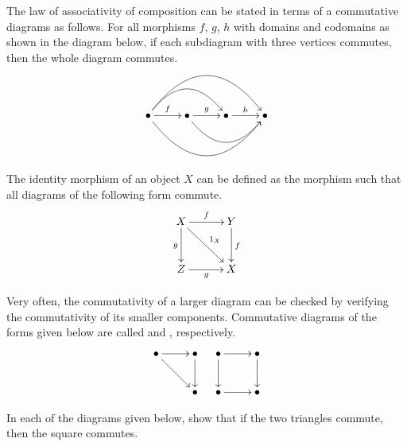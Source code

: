 \begin{Example}
The law of associativity of composition can be stated in terms of a commutative diagrams as follows. For all morphisms $f$, $g$, $h$ with domains and codomains as shown in the diagram below, if each subdiagram with three vertices commutes, then the whole diagram commutes.
\begin{equation*}
\xymatrix{
\bullet \ar[r]^f \ar@/^2pc/[rr] \ar@/^3pc/[rrr]^{} \ar@/_3pc/[rrr]_{}
& \bullet \ar[r]^g \ar@/_2pc/[rr]
& \bullet \ar[r]^h & \bullet
}
\end{equation*}

The identity morphism of an object $X$ can be defined as the morphism such that all diagrams of the following form commute.
\begin{equation*}
\xymatrix@=3em{
X \ar[r]^f \ar[rd]^{1_X} \ar[d]_g & Y \ar[d]^f \\
Z \ar[r]_g & X
}
\end{equation*}
\end{Example}

Very often, the commutativity of a larger diagram can be checked by verifying the commutativity of its smaller components. Commutative diagrams of the forms given below are called  and , respectively.
\begin{align*}
\xymatrix{
\bullet \ar[r] \ar[rd] & \bullet \ar[d]\\
& \bullet
}
&&
\xymatrix{
\bullet \ar[r] \ar[d] & \bullet \ar[d] \\
\bullet \ar[r] & \bullet
}
\end{align*}

\begin{Exercise}
In each of the diagrams given below, show that if the two triangles commute, then the square commutes.
\begin{figure}[H]
\centering
\subcaptionbox{\label{subfig:CommSq1}}{
$\xymatrix@=3em{
\bullet \ar[r] \ar[d] \ar[rd] & \bullet \ar[d] \\
\bullet \ar[r] & \bullet
}$
}
\hspace{0.3\textwidth}
\subcaptionbox{\label{subfig:CommSq2}}{
$\xymatrix@=3em{
\bullet \ar[r] \ar[d] & \bullet \ar[d] \ar[ld]\\
\bullet \ar[r] & \bullet
}$
}
\end{figure}
\end{Exercise}

